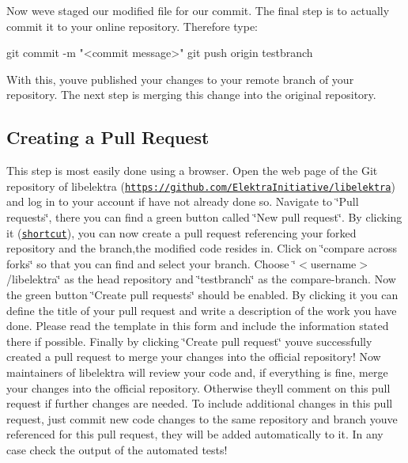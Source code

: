 Now we\textquotesingle{}ve staged our modified file for our commit. The final step is to actually commit it to your online repository. Therefore type\+:


\begin{DoxyCode}
git commit -m "<commit message>"
git push origin testbranch
\end{DoxyCode}


With this, you\textquotesingle{}ve published your changes to your remote branch of your repository. The next step is merging this change into the original repository.

\subsection*{Creating a Pull Request}

This step is most easily done using a browser. Open the web page of the Git repository of libelektra (\href{https://github.com/ElektraInitiative/libelektra}{\tt https\+://github.\+com/\+Elektra\+Initiative/libelektra}) and log in to your account if have not already done so. Navigate to \char`\"{}\+Pull
requests\char`\"{}, there you can find a green button called \char`\"{}\+New pull request\char`\"{}. By clicking it (\href{https://github.com/ElektraInitiative/libelektra/compare}{\tt shortcut}), you can now create a pull request referencing your forked repository and the branch,the modified code resides in. Click on \char`\"{}compare across forks\char`\"{} so that you can find and select your branch. Choose \char`\"{}$<$username$>$/libelektra\char`\"{} as the head repository and \char`\"{}testbranch\char`\"{} as the compare-\/branch. Now the green button \char`\"{}\+Create pull requests\char`\"{} should be enabled. By clicking it you can define the title of your pull request and write a description of the work you have done. Please read the template in this form and include the information stated there if possible. Finally by clicking \char`\"{}\+Create pull request\char`\"{} you\textquotesingle{}ve successfully created a pull request to merge your changes into the official repository! Now maintainers of libelektra will review your code and, if everything is fine, merge your changes into the official repository. Otherwise they\textquotesingle{}ll comment on this pull request if further changes are needed. To include additional changes in this pull request, just commit new code changes to the same repository and branch you\textquotesingle{}ve referenced for this pull request, they will be added automatically to it. In any case check the output of the automated tests!

